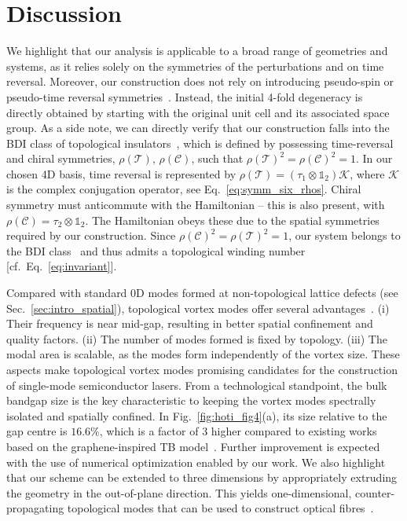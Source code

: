\section{Discussion}

We highlight that our analysis is applicable to a broad range of geometries and systems, as it relies solely on the symmetries of the perturbations and on time reversal. Moreover, our construction does not rely on introducing pseudo-spin or pseudo-time reversal symmetries~\cite{Wu_Hu_2015}. Instead, the initial 4-fold degeneracy is directly obtained by starting with the original unit cell and its associated space group. As a side note, we can directly verify that our construction falls into the BDI class of topological insulators~\cite{Teo_2010}, which is defined by possessing time-reversal and chiral symmetries, $\rho(\mathcal{T}) ,\, \rho(\mathcal{C})$, such that $\rho(\mathcal{T})^2 = \rho(\mathcal{C})^2 = 1$. In our chosen 4D basis, time reversal is represented by $\rho(\mathcal{T}) = \left( \tau_1 \otimes \mathbb{1}_2 \right) \mathcal{K}$, where $\mathcal{K}$ is the complex conjugation operator, see Eq.~\eqref{eq:symm_six_rhos}. Chiral symmetry must anticommute with the Hamiltonian -- this is also present, with $\rho(\mathcal{C}) = \tau_2 \otimes \mathbb{1}_2$. The Hamiltonian obeys these due to the spatial symmetries required by our construction. Since $\rho(\mathcal{C})^2 = \rho(\mathcal{T})^2 = 1$, our system belongs to the BDI class~\cite{Chiu_2016, Teo_2010} and thus admits a topological winding number [cf.~Eq.~\eqref{eq:invariant}].

Compared with standard 0D modes formed at non-topological lattice defects (see Sec.~\ref{sec:intro_spatial}), topological vortex modes offer several advantages~\cite{Gao_2020}. (i) Their frequency is near mid-gap, resulting in better spatial confinement and quality factors. (ii) The number of modes formed is fixed by topology.  (iii) The modal area is scalable, as the modes form independently of the vortex size. These aspects make topological vortex modes promising candidates for the construction of single-mode semiconductor lasers. From a technological standpoint, the bulk bandgap size is the key characteristic to keeping the vortex modes spectrally isolated and spatially confined. In Fig.~\ref{fig:hoti_fig4}(a), its size relative to the gap centre is $16.6\%$, which is a factor of $3$ higher compared to existing works based on the graphene-inspired TB model~\cite{Gao_2020}. Further improvement is expected with the use of numerical optimization enabled by our work. We also highlight that our scheme can be extended to three dimensions by appropriately extruding the geometry in the out-of-plane direction. This yields one-dimensional, counter-propagating topological modes that can be used to construct optical fibres~\cite{Lin_2020, Lu_2018}.

